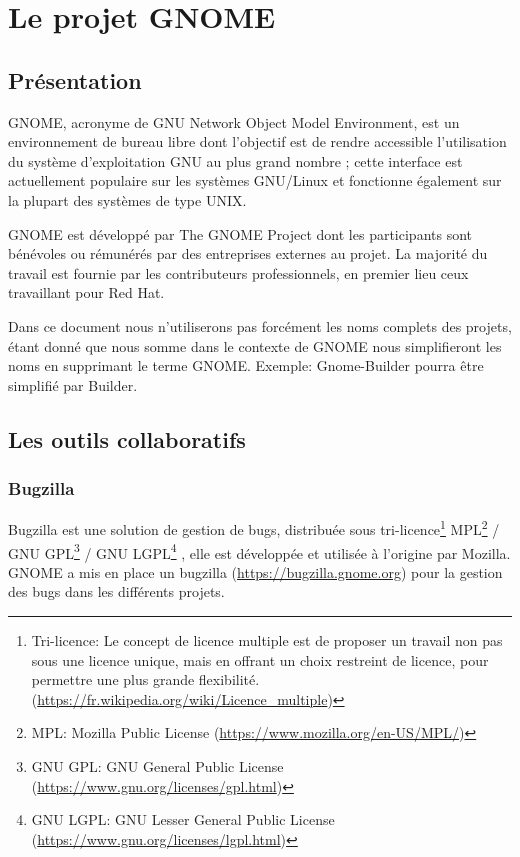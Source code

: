 \documentclass[12pt]{report}
\begin{document}

\chapter{Le projet GNOME}
\section{Présentation}
GNOME, acronyme de GNU Network Object Model Environment, est un
environnement de bureau libre  dont l'objectif est de rendre
accessible l'utilisation du système d'exploitation GNU au plus grand
nombre ; cette interface est actuellement populaire sur les systèmes
GNU/Linux et fonctionne également sur la plupart des systèmes de type
UNIX.

GNOME est développé par The GNOME Project dont les participants sont
bénévoles ou rémunérés par des entreprises externes au projet. La
majorité du travail est fournie par les contributeurs professionnels,
en premier lieu ceux travaillant pour Red Hat.

Dans ce document nous n'utiliserons pas forcément les noms complets des
projets, étant donné que nous somme dans le contexte de GNOME nous
simplifieront les noms en supprimant le terme GNOME.
Exemple: Gnome-Builder pourra être simplifié par Builder.

\section{Les outils collaboratifs} 
\subsection{Bugzilla}
\label{bugzilla}
Bugzilla est une solution de gestion de bugs, distribuée sous
tri-licence\footnote{Tri-licence: Le concept de licence multiple
  est de proposer un travail non pas sous une licence unique, mais
  en offrant un choix restreint de licence, pour permettre une plus
  grande flexibilité. 
  (\url{https://fr.wikipedia.org/wiki/Licence_multiple})}
MPL\footnote{MPL: Mozilla Public License 
  (\url{https://www.mozilla.org/en-US/MPL/})}
/ GNU GPL\footnote{GNU GPL: GNU General Public License 
  (\url{https://www.gnu.org/licenses/gpl.html})}
/ GNU LGPL\footnote{GNU LGPL: GNU Lesser General Public License 
  (\url{https://www.gnu.org/licenses/lgpl.html})}
, elle est développée et utilisée à l'origine par Mozilla.
GNOME a mis en place un bugzilla (\url{https://bugzilla.gnome.org}) pour 
la gestion des bugs dans les différents projets.
\end{document}
